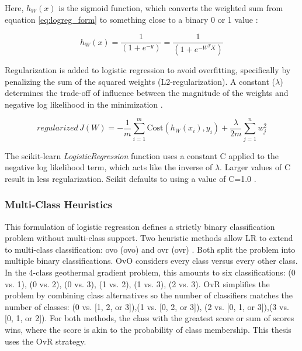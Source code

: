Here, $h_W(x)$ is the sigmoid function, which converts the weighted sum from equation \ref{eq:logreg_form} to something close to a binary 0 or 1 value \citep[~p 369]{bertsimas_analytics_2016}:

\begin{equation}
\label{eq:sigmoid}
h_W(x) = \frac{1}{(1+e^{-y})} = \frac{1}{(1+e^{-W^TX})}
\end{equation}

Regularization is added to logistic regression to avoid overfitting, specifically by penalizing the sum of the squared weights (L2-regularization). A constant ($\lambda$) determines the trade-off of influence between the magnitude of the weights and negative log likelihood in the minimization \citep{ng_regularization_2011}.

\begin{equation}
    regularized\,J(W) = -\frac{1}{m}\sum_{i=1}^{m}{\text{Cost}(h_{W}(x_i),y_i) + \frac{\lambda}{2m}\sum_{j=1}^{n}{w_j^2}}
\end{equation}

The scikit-learn \textit{LogisticRegression} function uses a constant C applied to the negative log likelihood term, which acts like the inverse of $\lambda$. Larger values of C result in less regularization. Scikit defaults to using a value of C=1.0 \citep{scikit-learn_1111_2021}.

\subsubsection{Multi-Class Heuristics} \label{ch5:multi_log_reg}

This formulation of logistic regression defines a strictly binary classification problem without multi-class support. Two heuristic methods allow LR to extend to multi-class classification: \acrlong{ovo} (\acrshort{ovo}) and \acrlong{ovr} (\acrshort{ovr}) \citep{brownlee_one-vs-rest_2020,scikit-learn_multiclass_2021}. Both split the problem into multiple binary classifications. OvO considers every class versus every other class. In the 4-class geothermal gradient problem, this amounts to six classifications: {(0 vs. 1), (0 vs. 2), (0 vs. 3), (1 vs. 2), (1 vs. 3), (2 vs. 3)}. OvR simplifies the problem by combining class alternatives so the number of classifiers matches the number of classes: {(0 vs. [1, 2, or 3]),(1 vs. [0, 2, or 3]), (2 vs. [0, 1, or 3]),(3 vs. [0, 1, or 2])}. For both methods, the class with the greatest score or sum of scores wins, where the score is akin to the probability of class membership. This thesis uses the OvR strategy.

